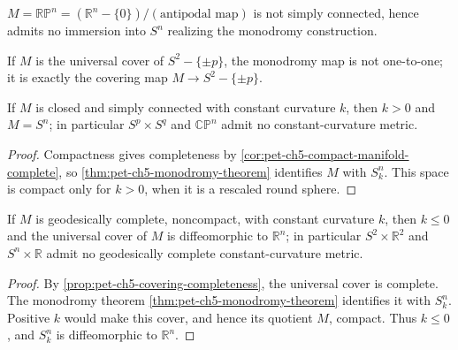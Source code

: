 \begin{example}
  \label{ex:pet-ch5-rp-n-no-immersion}

  $M=\mathbb{RP}^n=(\mathbb R^n-\{0\})/(\text{antipodal map})$ is not simply
  connected, hence admits no immersion into $S^n$ realizing the monodromy
  construction.
\end{example}

\begin{example}
  \label{ex:pet-ch5-universal-cover-monodromy}

  If $M$ is the universal cover of $S^2-\{\pm p\}$, the monodromy map is not
  one-to-one; it is exactly the covering map $M\to S^2-\{\pm p\}$.
\end{example}

\begin{corollary}
  \label{cor:pet-ch5-closed-simply-connected-constant-curvature}

  If $M$ is closed and simply connected with constant curvature $k$, then $k>0$
  and $M=S^n$; in particular $S^p\times S^q$ and $\mathbb{CP}^n$ admit no
  constant-curvature metric.
\end{corollary}
\begin{proof}
  \sketch
  Compactness gives completeness by \cref{cor:pet-ch5-compact-manifold-complete},
  so \cref{thm:pet-ch5-monodromy-theorem} identifies $M$ with $S_k^n$.  This space
  is compact only for $k>0$, when it is a rescaled round sphere.
\end{proof}

\begin{corollary}
  \label{cor:pet-ch5-noncompact-constant-curvature}

  If $M$ is geodesically complete, noncompact, with constant curvature $k$, then
  $k\le0$ and the universal cover of $M$ is diffeomorphic to $\mathbb R^n$; in
  particular $S^2\times\mathbb R^2$ and $S^n\times\mathbb R$ admit no geodesically
  complete constant-curvature metric.
\end{corollary}
\begin{proof}
  \sketch
  By \cref{prop:pet-ch5-covering-completeness}, the universal cover is complete.
  The monodromy theorem \cref{thm:pet-ch5-monodromy-theorem} identifies it with
  $S_k^n$.  Positive $k$ would make this cover, and hence its quotient $M$, compact.
  Thus $k\le0$, and $S_k^n$ is diffeomorphic to $\mathbb R^n$.
\end{proof}

